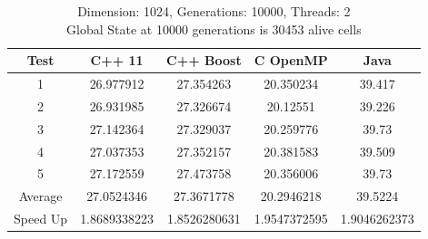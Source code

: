 \documentclass[11pt]{article} %
\begin{document}
\begin{table}[ht]
\caption{Dimension: 1024, Generations: 10000, Threads: 2\\Global State at 10000 generations is 30453 alive cells} %

\centering %

\begin{tabular}{c c c c c} %

\hline\hline %

Test & C++ 11 & C++ Boost & C OpenMP & Java \\ [0.5ex] %


\hline %

1 & 26.977912 & 27.354263 & 20.350234 & 39.417 \\
2 & 26.931985 & 27.326674 & 20.12551 & 39.226 \\
3 & 27.142364 & 27.329037 & 20.259776 & 39.73 \\
4 & 27.037353 & 27.352157 & 20.381583 & 39.509 \\
5 & 27.172559 & 27.473758 & 20.356006 & 39.73 \\
Average & 27.0524346 & 27.3671778 & 20.2946218 & 39.5224 \\
Speed Up & 1.8689338223 & 1.8526280631 & 1.9547372595 & 1.9046262373 \\ [1ex]




\hline %
\end{tabular}
\end{table}
\end{document}
